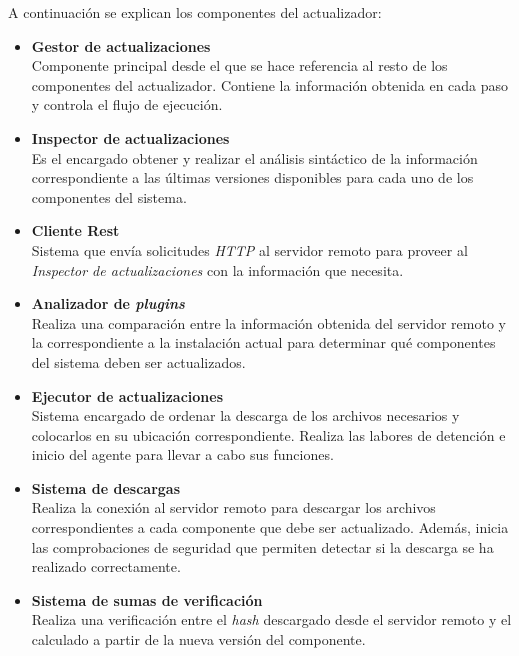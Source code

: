             A continuación se explican los componentes del actualizador:
            
            \begin{itemize}
                \item \textbf{Gestor de actualizaciones} \\
                Componente principal desde el que se hace referencia al resto de los componentes del actualizador. Contiene la información obtenida en cada paso y controla el flujo de ejecución. 
                
                \item \textbf{Inspector de actualizaciones} \\
                Es el encargado obtener y realizar el análisis sintáctico de la información correspondiente a las últimas versiones disponibles para cada uno de los componentes del sistema.
                
                \item \textbf{Cliente Rest} \\
                Sistema que envía solicitudes \textit{HTTP} al servidor remoto para proveer al \textit{Inspector de actualizaciones} con la información que necesita.
                
                \item \textbf{Analizador de \textit{plugins}} \\
                Realiza una comparación entre la información obtenida del servidor remoto y la correspondiente a la instalación actual para determinar qué componentes del sistema deben ser actualizados.
                
                \item \textbf{Ejecutor de actualizaciones} \\
                Sistema encargado de ordenar la descarga de los archivos necesarios y colocarlos en su ubicación correspondiente. Realiza las labores de detención e inicio del agente para llevar a cabo sus funciones.
                
                \item \textbf{Sistema de descargas} \\
                Realiza la conexión al servidor remoto para descargar los archivos correspondientes a cada componente que debe ser actualizado. Además, inicia las comprobaciones de seguridad que permiten detectar si la descarga se ha realizado correctamente.
                
                \item \textbf{Sistema de sumas de verificación} \\
                Realiza una verificación entre el \textit{hash} descargado desde el servidor remoto y el calculado a partir de la nueva versión del componente. \cite{checksum}
            \end{itemize}{}
            
